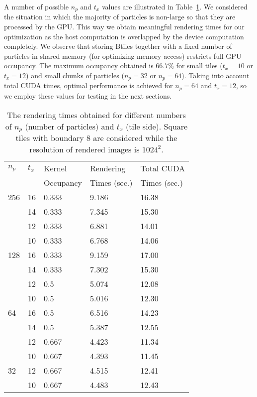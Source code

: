 \documentclass[1p]{elsarticle}
\begin{document}
A number of possible $n_p$ and $t_x$ values are illustrated in Table~\ref{tab:tuning}. We considered the situation in which the majority of particles is non-large so that they are processed by the GPU. This way we obtain meaningful rendering times for our optimization as the host computation is overlapped by the device computation completely. We observe that storing Btiles together with a fixed number of particles in shared memory (for optimizing memory access) restricts full GPU occupancy. The maximum occupancy obtained is $66.7\%$ for small tiles ($t_x = 10$ or $t_x = 12$) and small chunks of particles ($n_p = 32$ or $n_p=64$). Taking into account total CUDA times, optimal performance is achieved for $n_p=64$ and $t_x = 12$, so we employ these values for testing in the next sections.

\begin{table}
\label{tab:tuning}
\begin{center}
\begin{tabular}{|l|l|l|l|l|}
\hline
$n_p$ & $t_x$ & Kernel & Rendering & Total CUDA \\
& & Occupancy & Times (sec.) & Times (sec.) \\
\hline
256   & 16 & 0.333 & 9.186 & 16.38 \\
\hline
      & 14 & 0.333 & 7.345  & 15.30 \\
\hline
      & 12 & 0.333 & 6.881  & 14.01 \\
\hline
      & 10 & 0.333 & 6.768 & 14.06 \\
\hline
128   & 16 & 0.333 & 9.159 & 17.00 \\
\hline
      & 14 & 0.333 & 7.302  & 15.30 \\
\hline
      & 12 & 0.5 & 5.074  & 12.08 \\
\hline
      & 10 & 0.5 & 5.016 & 12.30 \\ 
\hline
64    & 16 & 0.5 & 6.516 & 14.23 \\
\hline
      & 14 & 0.5 & 5.387 & 12.55 \\
\hline
      & 12 & 0.667 & 4.423 & 11.34 \\
\hline
      & 10 & 0.667 & 4.393 & 11.45 \\ 
\hline
32    & 12 & 0.667 & 4.515 & 12.41 \\
\hline
      & 10 & 0.667 & 4.483 & 12.43 \\ 
\hline
\end{tabular}
\caption{The rendering times obtained for different numbers of $n_p$ (number of particles) and $t_x$ (tile side). Square tiles with boundary 8 are considered while the resolution of rendered images is $1024^{2}.$}
\end{center}
\end{table}
\end{document}
